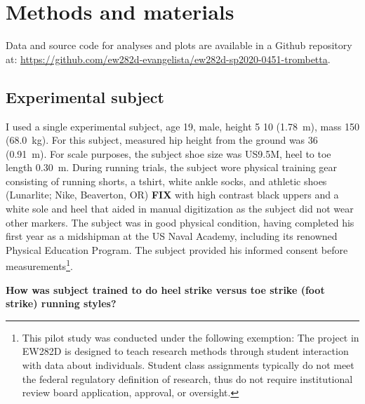 \section{Methods and materials}
\label{sec:methods}

Data and source code for analyses and plots are available in a Github repository at: \url{https://github.com/ew282d-evangelista/ew282d-sp2020-0451-trombetta}.

\subsection{Experimental subject}
I used a single experimental subject, age \SI{19}{\year}, male, height \SI{5}{\foot} \SI{10}{\inch} (\SI{1.78}{\meter}), mass \SI{150}{\pound} (\SI{68.0}{\kilo\gram}). For this subject, measured hip height from the ground was \SI{36}{\inch} (\SI{0.91}{\meter}). For scale purposes, the subject shoe size was US9.5M, heel to toe length \SI{0.30}{\meter}. During running trials, the subject wore physical training gear consisting of running shorts, a tshirt, white ankle socks, and athletic shoes (Lunarlite; Nike, Beaverton, OR) \textbf{FIX} with high contrast black uppers and a white sole and heel that aided in manual digitization as the subject did not wear other markers. The subject was in good physical condition, having completed his first year as a midshipman at the US Naval Academy, including its renowned Physical Education Program. The subject provided his informed consent before measurements\footnote{This pilot study was conducted under the following exemption: The project in EW282D is designed to teach research methods through student interaction with data about individuals. Student class assignments typically do not meet the federal regulatory definition of research, thus do not require institutional review board application, approval, or oversight.}.  

\textbf{How was subject trained to do heel strike versus toe strike (foot strike) running styles?}



